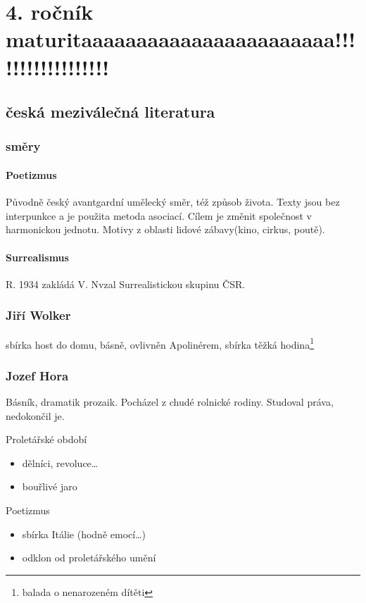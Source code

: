 \documentclass[10pt,a4page,headings,openany,%
oneside
,twocolumn
]{report}
\begin{document}
\part{4. ročník\\maturitaaaaaaaaaaaaaaaaaaaaaaa!!!!!!!!!!!!!!!!!!}

\chapter{česká meziválečná literatura}

\section{směry}

\subsection{Poetizmus}
Původně český avantgardní umělecký směr, též způsob života. Texty jsou bez interpunkce a je použita metoda asociací. Cílem je změnit společnost v harmonickou jednotu. Motivy z oblasti lidové zábavy(kino, cirkus, poutě). 

\subsection{Surrealismus}
R. 1934 zakládá V. Nvzal Surrealistickou skupinu ČSR.

\section{Jiří Wolker}
sbírka host do domu, básně, ovlivněn Apolinérem, sbírka těžká hodina\footnote{balada o nenarozeném dítěti}

\section{Jozef Hora}
Básník, dramatik prozaik. Pocházel z chudé rolnické rodiny. Studoval práva, nedokončil je.

\textsf{Proletářské období}
\begin{itemize}
\item dělníci, revoluce\dots
\item bouřlivé jaro
\end{itemize}

\textsf{Poetizmus}
\begin{itemize}
\item sbírka Itálie (hodně emocí\dots) 
\item odklon od proletářského umění

\end{itemize}
\end{document}
